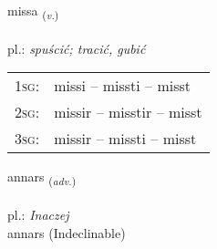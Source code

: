 \documentclass[frontgrid, backgrid]{flacards}\usepackage[]{graphicx}\usepackage[]{xcolor}
\begin{document}
\renewcommand{\flhead}{\vskip5pt \fboxsep=0pt {\small\bfseries\footnotesize Sagnorð | czasownik}}
\renewcommand{\fcfoot}{\vskip5pt \fboxsep=0pt \hspace{2pt}{\small\bfseries\footnotesize 1K}}

\renewcommand{\blhead}{\vskip5pt {\small\bfseries\footnotesize Sagnorð | czasownik }}
\renewcommand{\bcfoot}{\vskip5pt \hspace{2pt}{\small\bfseries\footnotesize 1K}}


{missa \small{\textsubscript{(\textit{v.})}} \\[1ex] %
\textphonetic{[mɪsa]} \\
pl.: \emph{spuścić; tracić, gubić} \\  [2ex]
\renewcommand*{\arraystretch}{0.8}
\begin{tabular}{p{1cm}l}
\textsc{1sg}: & missi -- missti -- misst \\ 
\textsc{2sg}: & missir -- misstir -- misst \\ 
\textsc{3sg}: & missir -- missti -- misst \\ 
\end{tabular}
}


\renewcommand{\flhead}{\vskip5pt \fboxsep=0pt {\small\bfseries\footnotesize Atviksorð | przysłówek}}
\renewcommand{\fcfoot}{\vskip5pt \fboxsep=0pt \hspace{2pt}{\small\bfseries\footnotesize 1K}}

\renewcommand{\blhead}{\vskip5pt {\small\bfseries\footnotesize Atviksorð | przysłówek }}
\renewcommand{\bcfoot}{\vskip5pt \hspace{2pt}{\small\bfseries\footnotesize 1K}}


{annars \small{\textsubscript{(\textit{adv.})}} \\[1ex]
\textphonetic{[anar̥s]} \\
pl.: \emph{Inaczej} \\  [2ex]
annars (Indeclinable)}
\end{document}

